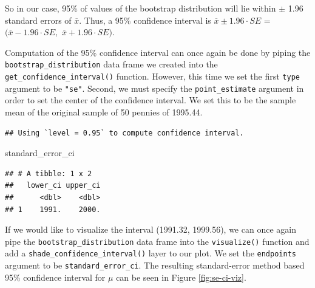 \documentclass[
]{book}
\newenvironment{Shaded}{\begin{snugshade}}{\end{snugshade}}
\newcommand{\DataTypeTok}[1]{\textcolor[rgb]{0.13,0.29,0.53}{#1}}
\newcommand{\FloatTok}[1]{\textcolor[rgb]{0.00,0.00,0.81}{#1}}
\newcommand{\KeywordTok}[1]{\textcolor[rgb]{0.13,0.29,0.53}{\textbf{#1}}}
\newcommand{\NormalTok}[1]{#1}
\newcommand{\OperatorTok}[1]{\textcolor[rgb]{0.81,0.36,0.00}{\textbf{#1}}}
\newcommand{\StringTok}[1]{\textcolor[rgb]{0.31,0.60,0.02}{#1}}
\begin{document}
So in our case, 95\% of values of the bootstrap distribution will lie within \(\pm\) 1.96 standard errors of \(\overline{x}\). Thus, a 95\% confidence interval is \(\overline{x} \pm 1.96 \cdot SE\) = \((\overline{x} - 1.96 \cdot SE,\) \(\overline{x} + 1.96 \cdot SE)\).

Computation of the 95\% confidence interval can once again be done by piping the \texttt{bootstrap\_distribution} data frame we created into the \texttt{get\_confidence\_interval()} function. However, this time we set the first \texttt{type} argument to be \texttt{"se"}. Second, we must specify the \texttt{point\_estimate} argument in order to set the center of the confidence interval. We set this to be the sample mean of the original sample of 50 pennies of 1995.44.

\begin{Shaded}
\end{Shaded}

\begin{verbatim}
## Using `level = 0.95` to compute confidence interval.
\end{verbatim}

\begin{Shaded}
\begin{Highlighting}[]
\NormalTok{standard_error_ci}
\end{Highlighting}
\end{Shaded}

\begin{verbatim}
## # A tibble: 1 x 2
##   lower_ci upper_ci
##      <dbl>    <dbl>
## 1    1991.    2000.
\end{verbatim}

If we would like to visualize the interval (1991.32, 1999.56), we can once again pipe the \texttt{bootstrap\_distribution} data frame into the \texttt{visualize()} function and add a \texttt{shade\_confidence\_interval()} layer to our plot. We set the \texttt{endpoints} argument to be \texttt{standard\_error\_ci}. The resulting standard-error method based 95\% confidence interval for \(\mu\) can be seen in Figure \ref{fig:se-ci-viz}.
\end{document}
